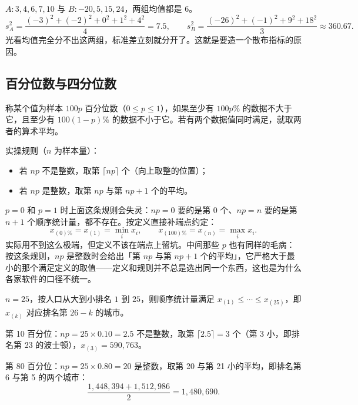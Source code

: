 \begin{example}
$A:3,4,6,7,10$ 与 $B:-20,5,15,24$，两组均值都是 $6$。
\[
s_A^{2}=\frac{(-3)^2+(-2)^2+0^2+1^2+4^2}{4}=7.5,\qquad
s_B^{2}=\frac{(-26)^2+(-1)^2+9^2+18^2}{3}\approx 360.67 .
\]
光看均值完全分不出这两组，标准差立刻就分开了。这就是要造一个散布指标的原因。
\end{example}

\subsection{百分位数与四分位数}

\begin{definition}[样本 $100p$ 百分位数]
称某个值为样本 $100p$ 百分位数（$0\le p\le 1$），如果至少有 $100p\%$ 的数据不大于它，且至少有 $100(1-p)\%$ 的数据不小于它。若有两个数据值同时满足，就取两者的算术平均。
\end{definition}

实操规则（$n$ 为样本量）：
\begin{itemize}
 \item 若 $np$ 不是整数，取第 $\lceil np\rceil$ 个（向上取整的位置）；
 \item 若 $np$ 是整数，取第 $np$ 与第 $np+1$ 个的平均。
\end{itemize}

\begin{remark}[两个端点得单独约定]
$p=0$ 和 $p=1$ 时上面这条规则会失灵：$np=0$ 要的是第 0 个、$np=n$ 要的是第 $n+1$ 个顺序统计量，都不存在。按定义直接补端点约定：
\[
x_{(0)\%}=x_{(1)}=\min_i x_i,\qquad x_{(100)\%}=x_{(n)}=\max_i x_i .
\]
实际用不到这么极端，但定义不该在端点上留坑。中间那些 $p$ 也有同样的毛病：按这条规则，$np$ 是整数时会给出「第 $np$ 与第 $np+1$ 个的平均」，它严格大于最小的那个满足定义的取值——定义和规则并不总是选出同一个东西，这也是为什么各家软件的口径不统一。
\end{remark}

\begin{example}
$n=25$，按人口从大到小排名 $1$ 到 $25$，则顺序统计量满足 $x_{(1)}\le\cdots\le x_{(25)}$，即 $x_{(k)}$ 对应排名第 $26-k$ 的城市。

第 10 百分位：$np=25\times0.10=2.5$ 不是整数，取第 $\lceil2.5\rceil=3$ 个（第 3 小，即排名第 23 的波士顿），$x_{(3)}=590{,}763$。

第 80 百分位：$np=25\times0.80=20$ 是整数，取第 20 与第 21 小的平均，即排名第 6 与第 5 的两个城市：
\[
\frac{1{,}448{,}394+1{,}512{,}986}{2}=1{,}480{,}690 .
\]
\end{example}

